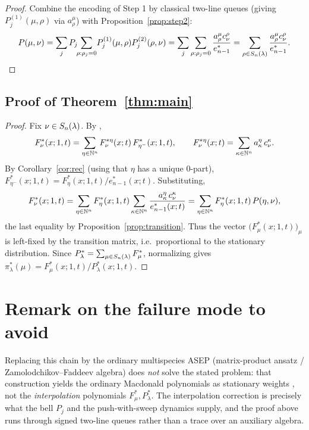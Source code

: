 \documentclass[11pt]{article}
\begin{document}
\begin{proof}
Combine the encoding of Step 1 by classical two-line queues
\cite[Lem.~5.4]{AMW25} (giving $P^{(1)}_j(\mu,\rho)$ via $a^\mu_\rho$) with
Proposition~\ref{prop:step2}:
\[
P(\mu,\nu)=\sum_j P_j\!\!\sum_{\rho:\rho_j=0}\!P^{(1)}_j(\mu,\rho)P^{(2)}_j(\rho,\nu)
=\sum_j\sum_{\rho:\rho_j=0}\frac{a^\mu_\rho c^\rho_\nu}{e^*_{n-1}}
=\sum_{\rho\in S_n(\lambda)}\frac{a^\mu_\rho c^\rho_\nu}{e^*_{n-1}}.
\]
\end{proof}

\subsection*{Proof of Theorem~\ref{thm:main}}

\begin{proof}
Fix $\nu\in S_n(\lambda)$. By \cite[Thm.~1.15, Lem.~5.6]{BDW25a},
\[
F^*_\nu(x;1,t)=\sum_{\eta\in\mathbb{N}^n}F^{*\eta}_\nu(x;t)\,F^*_{\eta^-}(x;1,t),
\qquad
F^{*\eta}_\nu(x;t)=\sum_{\kappa\in\mathbb{N}^n}a^\eta_\kappa\,c^\kappa_\nu .
\]
By Corollary~\ref{cor:rec} (using that $\eta$ has a unique $0$-part),
$F^*_{\eta^-}(x;1,t)=F^*_\eta(x;1,t)/e^*_{n-1}(x;t)$. Substituting,
\[
F^*_\nu(x;1,t)=\sum_{\eta\in\mathbb{N}^n}F^*_\eta(x;1,t)\sum_{\kappa\in\mathbb{N}^n}
\frac{a^\eta_\kappa\,c^\kappa_\nu}{e^*_{n-1}(x;t)}
=\sum_{\eta\in\mathbb{N}^n}F^*_\eta(x;1,t)\,P(\eta,\nu),
\]
the last equality by Proposition~\ref{prop:transition}. Thus the vector
$\bigl(F^*_\mu(x;1,t)\bigr)_\mu$ is left-fixed by the transition matrix, i.e.\
proportional to the stationary distribution. Since
$P^*_\lambda=\sum_{\mu\in S_n(\lambda)}F^*_\mu$, normalizing gives
$\pi^*_\lambda(\mu)=F^*_\mu(x;1,t)/P^*_\lambda(x;1,t)$.
\end{proof}

\section*{Remark on the failure mode to avoid}

Replacing this chain by the ordinary multispecies ASEP (matrix-product ansatz /
Zamolodchikov--Faddeev algebra) does \emph{not} solve the stated problem: that
construction yields the ordinary Macdonald polynomials as stationary weights
\cite{CMW22,AMW25}, not the \emph{interpolation} polynomials $F^*_\mu,P^*_\lambda$.
The interpolation correction is precisely what the bell $P_j$ and the
push-with-sweep dynamics supply, and the proof above runs through signed
two-line queues rather than a trace over an auxiliary algebra.
\end{document}
